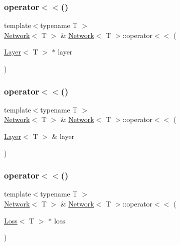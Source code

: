 \mbox{\label{class_network_a692179465a98c66b8797dfe880e9b283}} 
\subsubsection{\texorpdfstring{operator$<$$<$()}{operator<<()}\hspace{0.1cm}{\footnotesize\ttfamily [2/4]}}
{\footnotesize\ttfamily template$<$typename T $>$ \\
\mbox{\hyperlink{class_network}{Network}}$<$ T $>$ \& \mbox{\hyperlink{class_network}{Network}}$<$ T $>$\+::operator$<$$<$ (\begin{DoxyParamCaption}\item[{\mbox{\hyperlink{class_layer}{Layer}}$<$ T $>$ $\ast$}]{layer }\end{DoxyParamCaption})}

\mbox{\label{class_network_ad7c9d63ed466e31bf9a51fa4f3e23d7b}} 
\subsubsection{\texorpdfstring{operator$<$$<$()}{operator<<()}\hspace{0.1cm}{\footnotesize\ttfamily [3/4]}}
{\footnotesize\ttfamily template$<$typename T $>$ \\
\mbox{\hyperlink{class_network}{Network}}$<$ T $>$ \& \mbox{\hyperlink{class_network}{Network}}$<$ T $>$\+::operator$<$$<$ (\begin{DoxyParamCaption}\item[{\mbox{\hyperlink{class_layer}{Layer}}$<$ T $>$ \&}]{layer }\end{DoxyParamCaption})}

\mbox{\label{class_network_a79f5d0ee00c5d7dd88a7daa637e6b33d}} 
\subsubsection{\texorpdfstring{operator$<$$<$()}{operator<<()}\hspace{0.1cm}{\footnotesize\ttfamily [4/4]}}
{\footnotesize\ttfamily template$<$typename T $>$ \\
\mbox{\hyperlink{class_network}{Network}}$<$ T $>$ \& \mbox{\hyperlink{class_network}{Network}}$<$ T $>$\+::operator$<$$<$ (\begin{DoxyParamCaption}\item[{\mbox{\hyperlink{class_loss}{Loss}}$<$ T $>$ $\ast$}]{loss }\end{DoxyParamCaption})}

